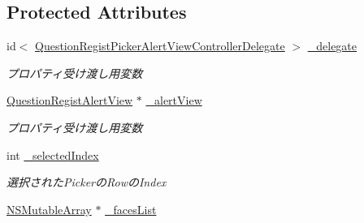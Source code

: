 \subsection*{Protected Attributes}
\begin{DoxyCompactItemize}
\item 
\hypertarget{interface_question_regist_picker_alert_view_controller_a0a46e4e6debc7098796ed24cef83baf5}{
id$<$ \hyperlink{protocol_question_regist_picker_alert_view_controller_delegate-p}{QuestionRegistPickerAlertViewControllerDelegate} $>$ \hyperlink{interface_question_regist_picker_alert_view_controller_a0a46e4e6debc7098796ed24cef83baf5}{\_\-delegate}}
\label{interface_question_regist_picker_alert_view_controller_a0a46e4e6debc7098796ed24cef83baf5}

\begin{DoxyCompactList}\small\item\em プロパティ受け渡し用変数 \end{DoxyCompactList}\item 
\hypertarget{interface_question_regist_picker_alert_view_controller_a62f68ce15fc0d0efc64a4e0ccdbdadc4}{
\hyperlink{interface_question_regist_alert_view}{QuestionRegistAlertView} $\ast$ \hyperlink{interface_question_regist_picker_alert_view_controller_a62f68ce15fc0d0efc64a4e0ccdbdadc4}{\_\-alertView}}
\label{interface_question_regist_picker_alert_view_controller_a62f68ce15fc0d0efc64a4e0ccdbdadc4}

\begin{DoxyCompactList}\small\item\em プロパティ受け渡し用変数 \end{DoxyCompactList}\item 
\hypertarget{interface_question_regist_picker_alert_view_controller_a4d70227a83455bd6df74c3a311d19ab2}{
int \hyperlink{interface_question_regist_picker_alert_view_controller_a4d70227a83455bd6df74c3a311d19ab2}{\_\-selectedIndex}}
\label{interface_question_regist_picker_alert_view_controller_a4d70227a83455bd6df74c3a311d19ab2}

\begin{DoxyCompactList}\small\item\em 選択されたPickerのRowのIndex \end{DoxyCompactList}\item 
\hypertarget{interface_question_regist_picker_alert_view_controller_a477a532f67e422643c04c971de5266c1}{
\hyperlink{class_n_s_mutable_array}{NSMutableArray} $\ast$ \hyperlink{interface_question_regist_picker_alert_view_controller_a477a532f67e422643c04c971de5266c1}{\_\-facesList}}
\label{interface_question_regist_picker_alert_view_controller_a477a532f67e422643c04c971de5266c1}


\end{DoxyCompactItemize}
